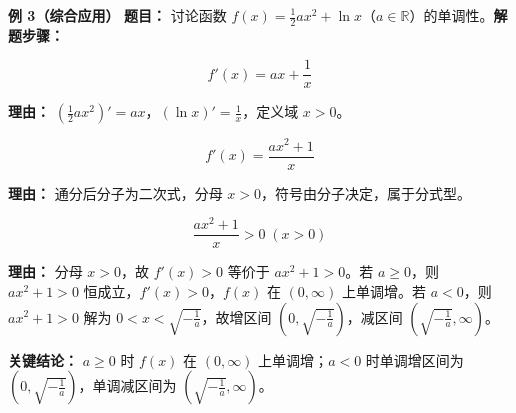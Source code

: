 \begin{examplebox}
	\medskip
	\textbf{\textcolor{CExample}{例 3（综合应用）}}
	\textbf{\textcolor{CExample}{题目：}} 讨论函数 $f(x)=\frac{1}{2}ax^2+\ln x$（$a\in\mathbb{R}$）的单调性。\textbf{\textcolor{CExample}{解题步骤：}}
	\begin{description}[style=nextline, leftmargin=2.8em, labelsep=0.5em, itemsep=0.45em]
		\item[\textbf{第一步（求导运算）：}]
			\[
				f'(x)=ax+\frac{1}{x}
			\]
			\par\textbf{理由：} $(\frac{1}{2}ax^2)'=ax$，$(\ln x)'=\frac{1}{x}$，定义域 $x>0$。
		\item[\textbf{第二步（识别类型）：}]
			\[
				f'(x)=\frac{ax^2+1}{x}
			\]
			\par\textbf{理由：} 通分后分子为二次式，分母 $x>0$，符号由分子决定，属于分式型。
		\item[\textbf{第三步（参数分类讨论）：}]
			\[
				\frac{ax^2+1}{x}>0\;(x>0)
			\]
			\par\textbf{理由：} 分母 $x>0$，故 $f'(x)>0$ 等价于 $ax^2+1>0$。若 $a\geq0$，则 $ax^2+1>0$ 恒成立，$f'(x)>0$，$f(x)$ 在 $(0,\infty)$ 上单调增。若 $a<0$，则 $ax^2+1>0$ 解为 $0<x<\sqrt{-\frac{1}{a}}$，故增区间 $(0,\sqrt{-\frac{1}{a}})$，减区间 $(\sqrt{-\frac{1}{a}},\infty)$。
	\end{description}
	\textbf{\textcolor{CExample}{关键结论：}}
	$a\geq0$ 时 $f(x)$ 在 $(0,\infty)$ 上单调增；$a<0$ 时单调增区间为 $(0,\sqrt{-\frac{1}{a}})$，单调减区间为 $(\sqrt{-\frac{1}{a}},\infty)$。
\end{examplebox}
